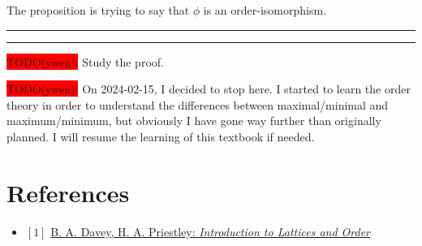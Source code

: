 \documentclass[12pt, letterpaper, oneside]{book}
\begin{document}
The proposition is trying to say that $\phi$ is an order-isomorphism.

\noindent\rule{10cm}{0.4pt}\rule{1cm}{10pt}

\colorbox{red}{TODO(ywen):} Study the proof.

\colorbox{red}{TODO(ywen):} On 2024-02-15, I decided to stop here. I started to learn the order theory in order to
understand the differences between maximal/minimal and maximum/minimum, but obviously I have gone way further than
originally planned. I will resume the learning of this textbook if needed.

%
%

\chapter*{References}

\begin{itemize}
  \item $[1]$ \href{https://www.cambridge.org/core/books/introduction-to-lattices-and-order/946458CB6638AF86D85BA00F5787F4F4}{B. A. Davey, H. A. Priestley: \it{Introduction to Lattices and Order}}
\end{itemize}
\end{document}
